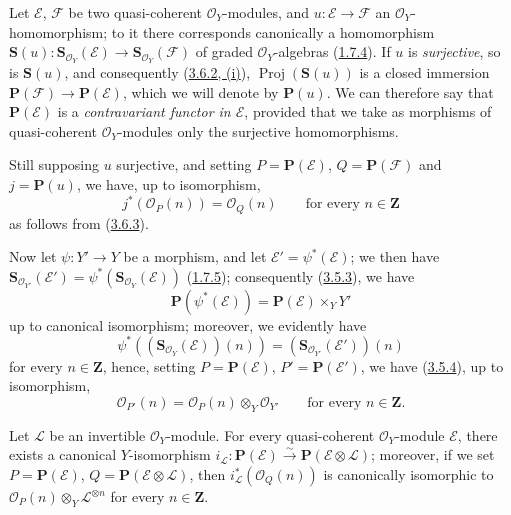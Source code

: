 \begin{env}[4.1.2]
\label{II.4.1.2}
Let $\mathcal{E}$, $\mathcal{F}$ be two quasi-coherent
$\mathcal{O}_Y$-modules, and $u:\mathcal{E}\to\mathcal{F}$ an
$\mathcal{O}_Y$-homomorphism; to it there corresponds canonically a
homomorphism
$\mathbf{S}(u):\mathbf{S}_{\mathcal{O}_Y}(\mathcal{E})\to
\mathbf{S}_{\mathcal{O}_Y}(\mathcal{F})$ of graded
$\mathcal{O}_Y$-algebras (\hyperref[II.1.7.4]{1.7.4}). If $u$ is
\emph{surjective}, so is $\mathbf{S}(u)$, and consequently
(\hyperref[II.3.6.2]{3.6.2, (i)}),
$\operatorname{Proj}(\mathbf{S}(u))$ is a closed immersion
$\mathbf{P}(\mathcal{F})\to\mathbf{P}(\mathcal{E})$, which we will denote by
$\mathbf{P}(u)$. We can therefore say that $\mathbf{P}(\mathcal{E})$ is a
\emph{contravariant functor in $\mathcal{E}$}, provided that we take as
morphisms of quasi-coherent $\mathcal{O}_Y$-modules only the surjective
homomorphisms.

Still supposing $u$ surjective, and setting
$P=\mathbf{P}(\mathcal{E})$, $Q=\mathbf{P}(\mathcal{F})$ and
$j=\mathbf{P}(u)$, we have, up to isomorphism,
\[
\label{II.4.1.2.1}
  j^*(\mathcal{O}_P(n))=\mathcal{O}_Q(n)
  \qquad\text{for every }n\in\mathbf{Z}
\tag{4.1.2.1}
\]
as follows from (\hyperref[II.3.6.3]{3.6.3}).
\end{env}

\begin{env}[4.1.3]
\label{II.4.1.3}
Now let $\psi:Y'\to Y$ be a morphism, and let
$\mathcal{E}'=\psi^*(\mathcal{E})$; we then have
$\mathbf{S}_{\mathcal{O}_{Y'}}(\mathcal{E}')=
\psi^*(\mathbf{S}_{\mathcal{O}_Y}(\mathcal{E}))$
(\hyperref[II.1.7.5]{1.7.5}); consequently
(\hyperref[II.3.5.3]{3.5.3}), we have
\[
\label{II.4.1.3.1}
  \mathbf{P}(\psi^*(\mathcal{E}))=
  \mathbf{P}(\mathcal{E})\times_YY'
\tag{4.1.3.1}
\]
up to canonical isomorphism; moreover, we evidently have
\[
  \psi^*((\mathbf{S}_{\mathcal{O}_Y}(\mathcal{E}))(n))
  =(\mathbf{S}_{\mathcal{O}_{Y'}}(\mathcal{E}'))(n)
\]
for every $n\in\mathbf{Z}$, hence, setting $P=\mathbf{P}(\mathcal{E})$,
$P'=\mathbf{P}(\mathcal{E}')$, we have
(\hyperref[II.3.5.4]{3.5.4}), up to isomorphism,
\[
\label{II.4.1.3.2}
  \mathcal{O}_{P'}(n)=\mathcal{O}_P(n)\otimes_Y\mathcal{O}_{Y'}
  \qquad\text{for every }n\in\mathbf{Z}.
\tag{4.1.3.2}
\]
\end{env}


\begin{proposition}[4.1.4]
\label{II.4.1.4}
Let $\mathcal{L}$ be an invertible $\mathcal{O}_Y$-module. For every
quasi-coherent $\mathcal{O}_Y$-module $\mathcal{E}$, there exists a canonical
$Y$-isomorphism
$i_{\mathcal{L}}:\mathbf{P}(\mathcal{E})\xrightarrow{\sim}
\mathbf{P}(\mathcal{E}\otimes\mathcal{L})$; moreover, if we set
$P=\mathbf{P}(\mathcal{E})$, $Q=\mathbf{P}(\mathcal{E}\otimes\mathcal{L})$,
then $i_{\mathcal{L}}^*(\mathcal{O}_Q(n))$ is canonically isomorphic to
$\mathcal{O}_P(n)\otimes_Y\mathcal{L}^{\otimes n}$ for every
$n\in\mathbf{Z}$.
\end{proposition}

